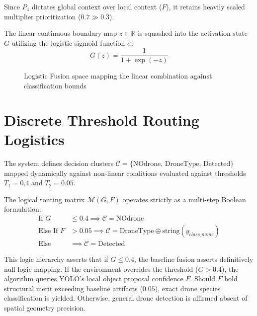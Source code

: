 \documentclass[11pt, letterpaper, oneside, openany]{book}
\begin{document}
Since $P_4$ dictates global context over local context ($F$), it retains heavily scaled multiplier prioritization ($0.7 \gg 0.3$).

The linear continuous boundary map $z \in \mathbb{R}$ is squashed into the activation state $G$ utilizing the logistic sigmoid function $\sigma$:
\begin{equation}
    G(z) = \frac{1}{1 + \exp(-z)}
\end{equation}

\begin{figure}[htbp]
    \centering
    \caption{Logistic Fusion space mapping the linear combination against classification bounds}
\end{figure}

\section{Discrete Threshold Routing Logistics}

The system defines decision clusters $\mathcal{C} = \text{\{NOdrone, DroneType, Detected\}}$ mapped dynamically against non-linear conditions evaluated against thresholds $T_1=0.4$ and $T_2=0.05$.

The logical routing matrix $\mathcal{M}(G, F)$ operates strictly as a multi-step Boolean formulation:
\begin{align}
    \text{If } G &\leq 0.4 \implies \mathcal{C} = \text{NOdrone} \\
    \text{Else If } F &> 0.05 \implies \mathcal{C} = \text{DroneType} \oplus \text{string}(y_{class\_name}) \\
    \text{Else } &\implies \mathcal{C} = \text{Detected}
\end{align}

This logic hierarchy asserts that if $G \leq 0.4$, the baseline fusion asserts definitively null logic mapping. If the environment overrides the threshold ($G > 0.4$), the algorithm queries YOLO's local object proposal confidence $F$. Should $F$ hold structural merit exceeding baseline artifacts ($0.05$), exact drone species classification is yielded. Otherwise, general drone detection is affirmed absent of spatial geometry precision.
\end{document}
